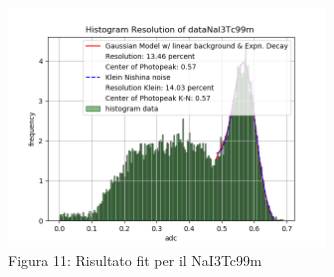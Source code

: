 \documentclass[a4paper]{article}
\begin{document}
\begin{figure}[H]
\centering
\includegraphics[width=0.75\textwidth]{histkleindataNaI3Tc99m}
\caption{Figura 11: Risultato fit per il NaI3Tc99m}
\end{figure}
\end{document}
